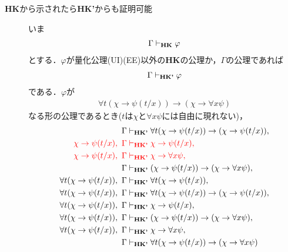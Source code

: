 \begin{metaprf}
\begin{description}
		\item[{\bf HK}から示されたら{\bf HK'}からも証明可能]
			いま
			\begin{align}
				\Gamma \vdash_{{\scriptsize \mbox{{\bf HK}}}} \varphi
			\end{align}
			とする．$\varphi$が量化公理(UI)(EE)以外の{\bf HK}の公理か，$\Gamma$の公理であれば
			\begin{align}
				\Gamma \vdash_{{\scriptsize \mbox{{\bf HK'}}}} \varphi
			\end{align}
			である．$\varphi$が
			\begin{align}
				\forall t (\chi \rightarrow \psi(t/x)) 
				\rightarrow (\chi \rightarrow \forall x \psi)
			\end{align}
			なる形の公理であるとき($t$は$\chi$と$\forall x \psi$には自由に現れない)，
			\begin{align}
				\Gamma &\provable{\mbox{{\bf HK'}}} 
					\forall t (\chi \rightarrow \psi(t/x)) 
					\rightarrow (\chi \rightarrow \psi(t/x)), \\
				\color{red}\chi \rightarrow \psi(t/x),\ \Gamma &
				\color{red}\provable{\mbox{{\bf HK'}}}
					\chi \rightarrow \psi(t/x), \\
				\color{red}\chi \rightarrow \psi(t/x),\ \Gamma &
				\color{red}\provable{\mbox{{\bf HK'}}}
					\chi \rightarrow \forall x \psi, \\
				\Gamma &\provable{\mbox{{\bf HK'}}} (\chi \rightarrow \psi(t/x)) 
					\rightarrow (\chi \rightarrow \forall x \psi), \\
				\forall t (\chi \rightarrow \psi(t/x)),\ \Gamma
					&\provable{\mbox{{\bf HK'}}} \forall t (\chi \rightarrow \psi(t/x)), \\
				\forall t (\chi \rightarrow \psi(t/x)),\ \Gamma
					&\provable{\mbox{{\bf HK'}}} \forall t (\chi \rightarrow \psi(t/x)) 
					\rightarrow (\chi \rightarrow \psi(t/x)), \\
				\forall t (\chi \rightarrow \psi(t/x)),\ \Gamma
					&\provable{\mbox{{\bf HK'}}} \chi \rightarrow \psi(t/x), \\
				\forall t (\chi \rightarrow \psi(t/x)),\ \Gamma
					&\provable{\mbox{{\bf HK'}}} (\chi \rightarrow \psi(t/x)) 
					\rightarrow (\chi \rightarrow \forall x \psi), \\
				\forall t (\chi \rightarrow \psi(t/x)),\ \Gamma
					&\provable{\mbox{{\bf HK'}}} \chi \rightarrow \forall x \psi, \\
				\Gamma &\provable{\mbox{{\bf HK'}}} \forall t (\chi \rightarrow \psi(t/x)) 
					\rightarrow (\chi \rightarrow \forall x \psi)

\end{align}
\end{description}
\end{metaprf}
